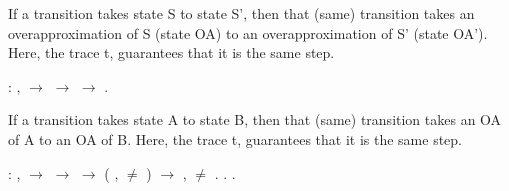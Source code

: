 \documentclass[12pt]{report}
\begin{document}
 If a transition takes state S to state S', then
        that (same) transition takes an overapproximation
        of S (state OA) to an overapproximation of S' (state OA').
        Here, the trace t, guarantees that it is the same step.
    
\begin{coqdoccode}
\coqdocemptyline
\coqdocindent{2.00em}
 : \coqdockw{\ensuremath{\forall}}     ,\coqdoceol
\coqdocindent{4.00em}
   \ensuremath{\rightarrow}\coqdoceol
\coqdocindent{4.00em}
    \ensuremath{\rightarrow}\coqdoceol
\coqdocindent{4.00em}
    \ensuremath{\rightarrow}\coqdoceol
\coqdocindent{3.00em}
  .\coqdoceol
\coqdocemptyline
\end{coqdoccode}
If a transition takes state A to state B, then
        that (same) transition takes an OA of A to an
        OA of B. Here, the trace t, guarantees that it
        is the same step.
\begin{coqdoccode}
\coqdocindent{2.00em}
  : \coqdockw{\ensuremath{\forall}}     ,\coqdoceol
\coqdocindent{4.00em}
   \ensuremath{\rightarrow}\coqdoceol
\coqdocindent{4.00em}
    \ensuremath{\rightarrow}\coqdoceol
\coqdocindent{4.00em}
    \ensuremath{\rightarrow}\coqdoceol
\coqdocindent{4.00em}
(\coqdockw{\ensuremath{\forall}}  ,  \ensuremath{\not=}   ) \ensuremath{\rightarrow}\coqdoceol
\coqdocindent{3.00em}
\coqdockw{\ensuremath{\forall}}  ,  \ensuremath{\not=}   .\coqdoceol
\coqdocemptyline
\coqdocemptyline
\coqdocindent{1.00em}
     .\coqdoceol
\coqdocnoindent
{}     .\coqdoceol
\coqdocemptyline
\end{coqdoccode}
\end{document}
